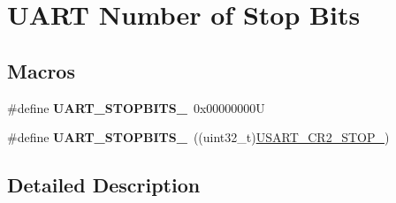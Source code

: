 \hypertarget{group___u_a_r_t___stop___bits}{}\section{U\+A\+RT Number of Stop Bits}
\label{group___u_a_r_t___stop___bits}
\subsection*{Macros}
\begin{DoxyCompactItemize}
\item 
\mbox{\label{group___u_a_r_t___stop___bits_ga7cf97e555292d574de8abc596ba0e2ce}} 
\#define {\bfseries U\+A\+R\+T\+\_\+\+S\+T\+O\+P\+B\+I\+T\+S\+\_}~0x00000000U
\item 
\mbox{\label{group___u_a_r_t___stop___bits_ga91616523380f7450aac6cb7e17f0c0f2}} 
\#define {\bfseries U\+A\+R\+T\+\_\+\+S\+T\+O\+P\+B\+I\+T\+S\+\_}~((uint32\+\_\+t)\mbox{\hyperlink{group___peripheral___registers___bits___definition_ga2b24d14f0e5d1c76c878b08aad44d02b}{U\+S\+A\+R\+T\+\_\+\+C\+R2\+\_\+\+S\+T\+O\+P\+\_}})
\end{DoxyCompactItemize}


\subsection{Detailed Description}
